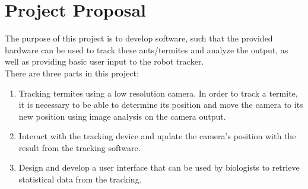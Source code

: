 
\section{Project Proposal}


The purpose of this project is to develop software, such that the provided hardware can be used to track these ants/termites and analyze the output, as well as providing basic user input to the robot tracker. \\

There are three parts in this project:  

\begin{enumerate}
\item Tracking termites using a low resolution camera. In order to track a termite, it is necessary to be able to determine its position and move the camera to its new position using image analysis on the camera output. 

\item Interact with the tracking device and update the camera's position with the result from the tracking software. 

\item Design and develop a user interface that can be used by biologists to retrieve statistical data from the tracking.  
\end{enumerate}